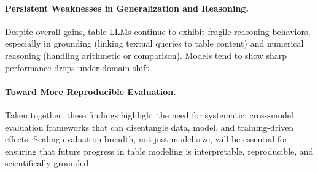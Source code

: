 \documentclass[11pt]{article}
\begin{document}
\paragraph{Persistent Weaknesses in Generalization and Reasoning.}
Despite overall gains, table LLMs continue to exhibit fragile reasoning behaviors, especially in grounding (linking textual queries to table content) and numerical reasoning (handling arithmetic or comparison). 
Models tend to show sharp performance drops under domain shift.

\paragraph{Toward More Reproducible Evaluation.}
Taken together, these findings highlight the need for systematic, cross-model evaluation frameworks that can disentangle data, model, and training-driven effects.
Scaling evaluation breadth, not just model size, will be essential for ensuring that future progress in table modeling is interpretable, reproducible, and scientifically grounded.

\end{document}
